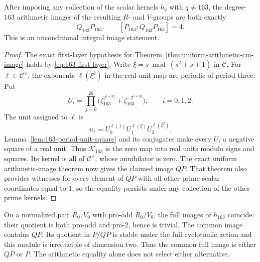 \begin{theorem}
\label{thm:163-exact-arithmetic-image}
After imposing any collection of the scalar kernels
\(h_q\) with \(q\ne163\), the degree-\(163\) arithmetic
images of the resulting \(R\)- and \(V\)-groups are
both exactly
\[
 Q_{163}P_{163},\qquad [P_{163}:Q_{163}P_{163}]=4.
\]
This is an unconditional integral image statement.
\end{theorem}
\begin{proof}
The exact first-layer hypothesis for
Theorem~\ref{thm:uniform-arithmetic-cm-image} holds by
\eqref{eq:163-first-layer}.
Write
\(\xi=s\bmod(s^2+s+1)\) in \(\mathscr C\).
For \(\ell\in\mathscr C^\vee\), the exponents
\(\ell(\xi^k)\) in the real-unit map are periodic of
period three. Put
\[
 U_i=\prod_{j=0}^{26}
  \bigl(\zeta_{163}^{2^{i+3j}}
                   +\zeta_{163}^{-2^{i+3j}}\bigr),
 \qquad i=0,1,2.
\]
The unit assigned to \(\ell\) is
\[
 u_\ell=U_0^{\ell(1)}U_1^{\ell(\xi)}U_2^{\ell(\xi^2)}.
\]
Lemma~\ref{lem:163-period-unit-square} and its conjugates
make every \(U_i\) a negative square of a real unit.
Thus \(\mathscr K_{163}\) is the zero map into real units
modulo signs and squares. Its kernel is all of
\(\mathscr C^\vee\), whose annihilator is zero.
The exact uniform arithmetic-image theorem now gives
the claimed image \(QP\). That theorem also provides
witnesses for every element of \(QP\) with all other
prime scalar coordinates equal to \(1\), so the equality
persists under any collection of the other-prime kernels.
\end{proof}

On a normalized pair \(R_0,V_0\) with pro-odd
\(R_0/V_0\), the full images of \(h_{163}\) coincide:
their quotient is both pro-odd and pro-\(2\), hence is
trivial. The common image contains \(QP\).
Its quotient in \(P/QP\) is stable under the full
cyclotomic action and this module is irreducible of
dimension two. Thus the common full image is either
\(QP\) or \(P\). The arithmetic equality alone does not
select either alternative.

